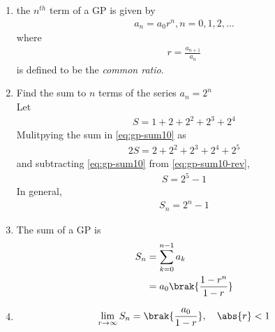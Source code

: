 \begin{enumerate}[label=\thesubsection.\arabic*,ref=\thesubsection.\theenumi]
	\item the $n^{th}$ term of a GP is given by 
\begin{align}
	\label{eq:gp-nthterm}
	a_n = a_0r^n, n = 0,1,2, \dots 
\end{align}
where 
\begin{align}
	r = \frac{a_{n+1}}{a_n}
\end{align}
		is defined to be the {\em common ratio}.
\item Find the sum to $n$ terms of the series
$a_n = 2^n$
	\\
	\solution
	Let
\begin{align}
	\label{eq:gp-sum10}
	S = 1 + 2 + 2^2 + 2^3 + 2^4
\end{align}
Mulitpying the sum in
	\eqref{eq:gp-sum10}
	as
\begin{align}
	\label{eq:gp-sum10-rev}
	2S =  2 + 2^2 + 2^3 + 2^4+ 2^5
\end{align}
and  subtracting
	\eqref{eq:gp-sum10}
	from
	\eqref{eq:gp-sum10-rev},
\begin{align}
	\label{eq:gp-sum10-add}
	S = 2^5 - 1
\end{align}
In general, 
\begin{align}
	S_{n} = 2^{n}-1
\end{align}
\item The sum of a GP is 
\begin{align}
	S_n &= \sum_{k=0}^{n-1}a_k  
	\\
	&= a_0\brak{\frac{1-r^{n}}{1-r}}
	\label{eq:gp-sumn}
\end{align}
\item 
\begin{align}
	\lim_{r\to\infty}	S_n = 
	 \brak{\frac{a_0}{1-r}},\quad \abs{r} < 1
	\label{eq:gp-sumn-infty}
\end{align}
\end{enumerate}
